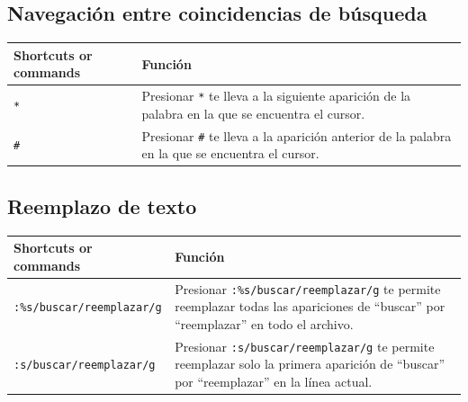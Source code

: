 \documentclass[
  doc,
  floatsintext,
  longtable,
  a4paper,
  nolmodern,
  notxfonts,
  notimes,
  12pt,
  colorlinks=true,linkcolor=blue,citecolor=blue,urlcolor=blue]{apa7}
\newcounter{none} %
\begin{document}
\subsection{Navegación entre coincidencias de
búsqueda}\label{navegaciuxf3n-entre-coincidencias-de-buxfasqueda}

{\def\LTcaptype{none} %
\begin{longtable}[]{@{}
  >{\raggedright\arraybackslash}p{}
  >{\raggedright\arraybackslash}p{}@{}}
\toprule\noalign{}
\begin{minipage}[b]{\linewidth}\raggedright
Shortcuts or commands
\end{minipage} & \begin{minipage}[b]{\linewidth}\raggedright
Función
\end{minipage} \\
\midrule\noalign{}
\endhead
\bottomrule\noalign{}
\endlastfoot
\texttt{*} & Presionar \texttt{*} te lleva a la siguiente aparición de
la palabra en la que se encuentra el cursor. \\
\texttt{\#} & Presionar \texttt{\#} te lleva a la aparición anterior de
la palabra en la que se encuentra el cursor. \\
\end{longtable}
}

\subsection{Reemplazo de texto}\label{reemplazo-de-texto}

{\def\LTcaptype{none} %
\begin{longtable}[]{@{}
  >{\raggedright\arraybackslash}p{}
  >{\raggedright\arraybackslash}p{}@{}}
\toprule\noalign{}
\begin{minipage}[b]{\linewidth}\raggedright
Shortcuts or commands
\end{minipage} & \begin{minipage}[b]{\linewidth}\raggedright
Función
\end{minipage} \\
\midrule\noalign{}
\endhead
\bottomrule\noalign{}
\endlastfoot
\texttt{:\%s/buscar/reemplazar/g} & Presionar
\texttt{:\%s/buscar/reemplazar/g} te permite reemplazar todas las
apariciones de ``buscar'' por ``reemplazar'' en todo el archivo. \\
\texttt{:s/buscar/reemplazar/g} & Presionar
\texttt{:s/buscar/reemplazar/g} te permite reemplazar solo la primera
aparición de ``buscar'' por ``reemplazar'' en la línea actual. \\
\end{longtable}
}
\end{document}
